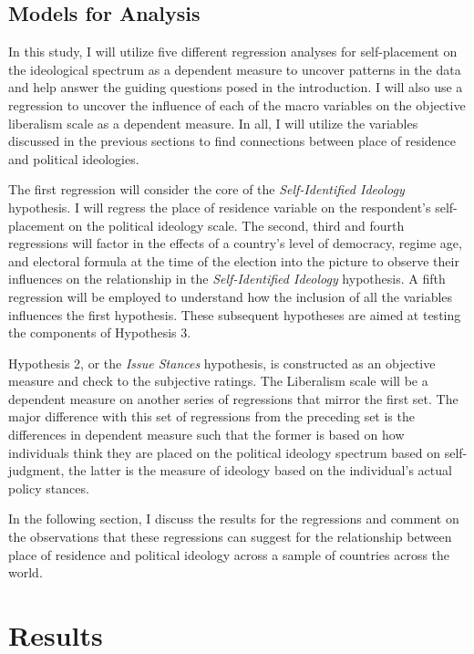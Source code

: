 \documentclass[12pt, titlepage]{article}
\newcommand\e{\emph}
\begin{document}
\subsection{Models for Analysis}

In this study, I will utilize five different regression analyses for self-placement on the ideological spectrum as a dependent measure to uncover patterns in the data and help answer the guiding questions posed in the introduction. I will also use a regression to uncover the influence of each of the macro variables on the objective liberalism scale as a dependent measure. In all, I will utilize the variables discussed in the previous sections to find connections between place of residence and political ideologies.

The first regression will consider the core of the \e{Self-Identified Ideology} hypothesis. I will regress the place of residence variable on the respondent's self-placement on the political ideology scale. The second, third and fourth regressions will factor in the effects of a country's level of democracy, regime age, and electoral formula at the time of the election into the picture to observe their influences on the relationship in the \e{Self-Identified Ideology} hypothesis. A fifth regression will be employed to understand how the inclusion of all the variables influences the first hypothesis. These subsequent hypotheses are aimed at testing the components of Hypothesis 3.

Hypothesis 2, or the \e{Issue Stances} hypothesis, is constructed as an objective measure and check to the subjective ratings. The Liberalism scale will be a dependent measure on another series of regressions that mirror the first set. The major difference with this set of regressions from the preceding set is the differences in dependent measure such that the former is based on how individuals think they are placed on the political ideology spectrum based on self-judgment, the latter is the measure of ideology based on the individual's actual policy stances.

In the following section, I discuss the results for the regressions and comment on the observations that these regressions can suggest for the relationship between place of residence and political ideology across a sample of countries across the world.

\section{Results}
\end{document}

